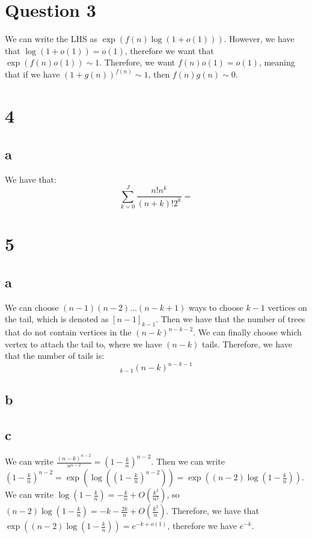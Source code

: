 \documentclass[]{article}
\begin{document}
\section{Question 3}
We can write the LHS as $\exp(f(n) \log(1 + o(1)))$. However, we have that $\log(1 + o(1)) = o(1)$, therefore we want that $\exp(f(n) o(1)) \sim 1$. Therefore, we want $f(n) o(1) = o(1)$, meaning that if we have $(1 + g(n))^{f(n)} \sim 1$, then $f(n)g(n) \sim 0$.  

\section{4}
\subsection{a}
We have that:
\begin{equation}
	\sum_{k = 0}^{J} \frac{n! n^k }{(n + k)! 2^k} = 
\end{equation}

\section{5}
\subsection{a}
We can choose $(n - 1)(n - 2) ... (n-k + 1)$ ways to choose $k - 1$ vertices on the tail, which is denoted as $[n - 1]_{k - 1}$. Then we have that the number of trees that do not contain vertices in the  $(n - k)^{n - k - 2}$. We can finally choose which vertex to attach the tail to, where we have $(n - k)$ tails. Therefore, we have that the number of tails is:
\begin{equation}
	[n - 1]_{k - 1} (n - k)^{n - k - 1}
\end{equation}

\subsection{b}
\subsection{c}
We can write $\frac{(n - k)^{n - 2}}{n^{n - 2}} = (1 - \frac{k}{n})^{n - 2}$. Then we can write $(1 - \frac{k}{n})^{n - 2} = \exp(\log((1 - \frac{k}{n})^{n - 2})) = \exp((n - 2) \log( 1 - \frac{k}{n}))$. We can write $\log( 1 - \frac{k}{n}) = - \frac{k}{n} + O(\frac{k^2}{n^2})$, so $(n -2)\log( 1 - \frac{k}{n}) = - k - \frac{2k}{n} + O(\frac{k^2}{n})$. Therefore, we have that $\exp((n - 2) \log( 1 - \frac{k}{n})) = e^{-k + o(1)}$, therefore we have $e^{-k}$. 
\end{document}
